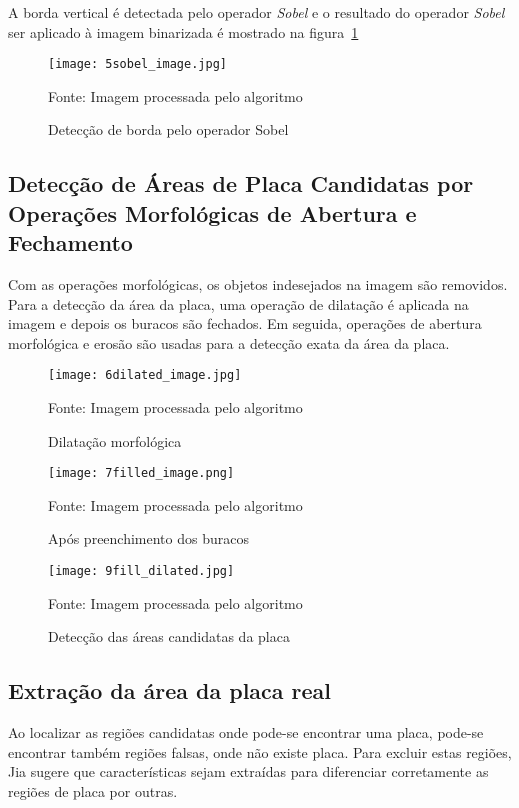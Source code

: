 A borda vertical é detectada pelo operador \emph{Sobel} e o resultado do operador \emph{Sobel}
ser aplicado à imagem binarizada é mostrado na figura~\ref{fig:ext_edge_detection_sobel}

\begin{figure}[H]
	\centering
	\texttt{[image: 5sobel\_image.jpg]}
	\caption{Detecção de borda pelo operador Sobel}
Fonte: Imagem processada pelo algoritmo
	\label{fig:ext_edge_detection_sobel}
\end{figure}

\subsection{Detecção de Áreas de Placa Candidatas por Operações Morfológicas de Abertura e Fechamento}

Com as operações morfológicas, os objetos indesejados na imagem são removidos.
Para a detecção da área da placa, uma operação de dilatação é aplicada na imagem
e depois os buracos são fechados. Em seguida, operações de abertura morfológica
e erosão são usadas para a detecção exata da área da placa.

\begin{figure}[H]
	\centering
	\texttt{[image: 6dilated\_image.jpg]}
	\caption{Dilatação morfológica}
Fonte: Imagem processada pelo algoritmo
	\label{fig:ext_morphological_dilation}
\end{figure}

\begin{figure}[H]
	\centering
	\texttt{[image: 7filled\_image.png]}
	\caption{Após preenchimento dos buracos}
Fonte: Imagem processada pelo algoritmo
	\label{fig:ext_holes_filled}
\end{figure}

\begin{figure}[H]
	\centering
	\texttt{[image: 9fill\_dilated.jpg]}
	\caption{Detecção das áreas candidatas da placa}
Fonte: Imagem processada pelo algoritmo
	\label{fig:ext_plate_area_detection}
\end{figure}

\subsection{Extração da área da placa real}

Ao localizar as regiões candidatas onde pode-se encontrar uma placa, pode-se encontrar também regiões falsas, onde não existe placa. Para excluir estas regiões, Jia \cite{jia2007region} sugere que características sejam extraídas para diferenciar corretamente as regiões de placa por outras. 

